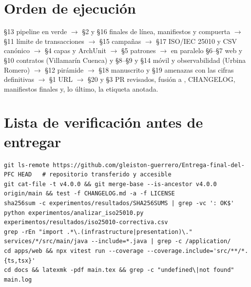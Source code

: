 \section{Orden de ejecuci\'on}
\S13 pipeline en verde $\rightarrow$ \S2 y \S16 finales de l\'inea, manifiestos y compuerta $\rightarrow$ \S11 l\'imite de transacciones $\rightarrow$ \S15 campa\~nas $\rightarrow$ \S17 ISO/IEC 25010 y CSV can\'onico $\rightarrow$ \S4 capas y ArchUnit $\rightarrow$ \S5 patrones $\rightarrow$ en paralelo \S6--\S7 web y \S10 contratos (Villamar\'in Cuenca) y \S8--\S9 y \S14 m\'ovil y observabilidad (Urbina Romero) $\rightarrow$ \S12 pir\'amide $\rightarrow$ \S18 manuscrito y \S19 amenazas con las cifras definitivas $\rightarrow$ \S1 URL $\rightarrow$ \S20 y \S3 PR revisados, fusi\'on a , CHANGELOG, manifiestos finales y, lo \'ultimo, la etiqueta anotada.

\section{Lista de verificaci\'on antes de entregar}
\begin{verbatim}
git ls-remote https://github.com/gleiston-guerrero/Entrega-final-del-PFC HEAD   # repositorio transferido y accesible
git cat-file -t v4.0.0 && git merge-base --is-ancestor v4.0.0 origin/main && test -f CHANGELOG.md -a -f LICENSE
sha256sum -c experimentos/resultados/SHA256SUMS | grep -vc ': OK$'
python experimentos/analizar_iso25010.py experimentos/resultados/iso25010-correctiva.csv
grep -rEn "import .*\.(infrastructure|presentation)\." services/*/src/main/java --include=*.java | grep -c /application/
cd apps/web && npx vitest run --coverage --coverage.include='src/**/*.{ts,tsx}'
cd docs && latexmk -pdf main.tex && grep -c "undefined\|not found" main.log
\end{verbatim}

\piedepagina

